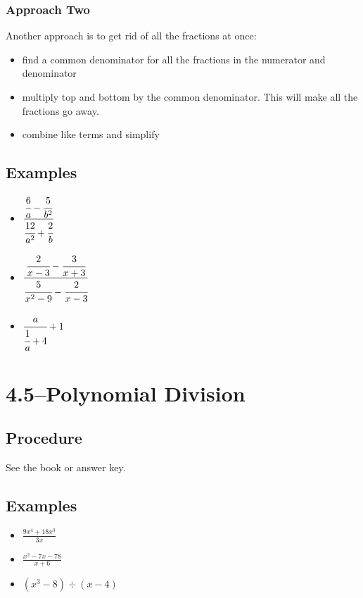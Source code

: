\documentclass[fleqn,addpoints]{exam}
\begin{document}
\subsubsection{Approach Two}

Another approach is to get rid of all the fractions at once:
\begin{itemize}
  \item find a common denominator for all the fractions in the numerator and denominator
  \item multiply top and bottom by the common denominator.  This will make all the fractions go away.
  \item combine like terms and simplify
\end{itemize}

\subsection{Examples}

\begin{itemize}
  \item \( \displaystyle \cfrac{ \cfrac{6}{a} - \cfrac{5}{b^2} } { \cfrac{12}{a^2} + \cfrac{2}{b} } \)
  \item \( \displaystyle \cfrac{\cfrac{2}{x-3} - \cfrac{3}{x+3} } { \cfrac{5}{x^2-9} - \cfrac{2}{x-3} } \)
  \item \( \displaystyle \cfrac{a}{\cfrac{1}{a}+4} + 1 \)  
\end{itemize}

\section{4.5--Polynomial Division}

\subsection{Procedure}

See the book or answer key.

\subsection{Examples}
\begin{itemize}
  \item \( \displaystyle \frac{9x^4 + 18x^3}{3x} \)
  \item \( \displaystyle \frac{x^2-7x-78}{x+6} \)
  \item \( \displaystyle (x^3-8) \div (x-4) \)
\end{itemize}
\end{document}
